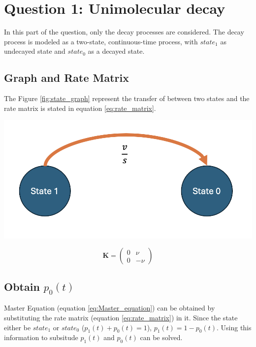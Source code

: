 \section{Question 1: Unimolecular decay}

In this part of the question, 
only the decay processes are considered. 
The decay process is modeled as a two-state, 
continuous-time process, with $state_1$ as undecayed state 
and $state_0$ as a decayed state.

\subsection{Graph and Rate Matrix}

The Figure \ref{fig:state_graph} represent the transfer of between
two states 
and the rate matrix is stated in equation \ref{eq:rate_matrix}.

\begin{minipage}{.5\textwidth}
\includegraphics[width=\linewidth]{img/figure1.png}
\label{fig:state_graph}
\end{minipage}
\begin{minipage}{.5\textwidth}
    \begin{equation}
        \mathbf{K} = \begin{pmatrix}
            0 & \nu \\
            0 & -\nu
            \end{pmatrix}
        \label{eq:rate_matrix}
    \end{equation} 
\end{minipage}

\subsection{Obtain $p_0(t)$ }
Master Equation (equation \ref{eq:Master_equation}) 
can be obtained by substituting the rate matrix
(equation \ref{eq:rate_matrix}) in it.
Since the state either be $state_1$ or $state_0$
($p_1(t) + p_0(t) = 1$),
$p_1(t) = 1 - p_0(t)$.
Using this information to subsitude $p_1(t)$ 
and $p_0(t)$ can be solved.

